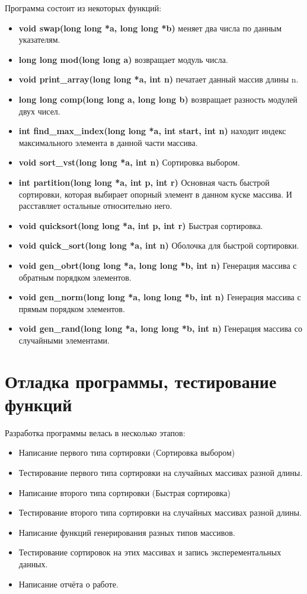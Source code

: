 \documentclass[a4paper,12pt,titlepage,final]{article}
\begin{document}
Программа состоит из некоторых функций:
\begin{itemize}
  \item {\bf \ttfamily void swap(long long *a, long long *b)} меняет два числа по данным указателям.
  \item {\bf \ttfamily long long mod(long long a)} возвращает модуль числа.
  \item {\bf \ttfamily void print\_array(long long *a, int n)} печатает данный массив длины n.
  \item {\bf \ttfamily long long comp(long long a, long long b)} возвращает разность модулей двух чисел.
  \item {\bf \ttfamily int find\_max\_index(long long *a, int start, int n)} находит индекс максимального элемента в данной части массива.
  \item {\bf \ttfamily void sort\_vst(long long *a, int n)} Сортировка выбором.
  \item {\bf \ttfamily int partition(long long *a, int p, int r)} Основная часть быстрой сортировки, которая выбирает опорный элемент в данном куске массива. И расставляет остальные относительно него.
  \item {\bf \ttfamily void quicksort(long long *a, int p, int r)} Быстрая сортировка.
  \item {\bf \ttfamily void quick\_sort(long long *a, int n)} Оболочка для быстрой сортировки.
  \item {\bf \ttfamily void gen\_obrt(long long *a, long long *b, int n)} Генерация массива с обратным порядком элементов.
  \item {\bf \ttfamily void gen\_norm(long long *a, long long *b, int n)} Генерация массива с прямым порядком элементов.
  \item {\bf \ttfamily void gen\_rand(long long *a, long long *b, int n)} Генерация массива со случайными элементами.
\end{itemize}

\newpage

\section{Отладка программы, тестирование функций}

Разработка программы велась в несколько этапов:
\begin{itemize}
  \item Написание первого типа сортировки (Сортировка выбором)
  \item Тестирование первого типа сортировки на случайных массивах разной длины.
  \item Написание второго типа сортировки (Быстрая сортировка)
  \item Тестирование второго типа сортировки на случайных массивах разной длины.
  \item Написание функций генерирования разных типов массивов.
  \item Тестирование сортировок на этих массивах и запись эксперементальных данных.
  \item Написание отчёта о работе.
\end{itemize}
\end{document}

